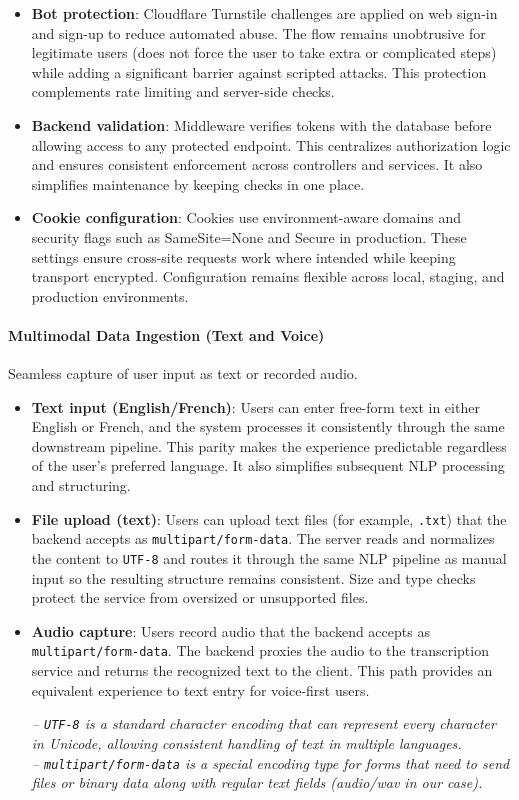 \documentclass[12pt,a4paper]{article}
\begin{document}
\begin{itemize}
  \item \textbf{Bot protection}: Cloudflare Turnstile challenges are applied on web sign-in and sign-up to reduce automated abuse. The flow remains unobtrusive for legitimate users (does not force the user to take extra or complicated steps) while adding a significant barrier against scripted attacks. This protection complements rate limiting and server-side checks.
  \item \textbf{Backend validation}: Middleware verifies tokens with the database before allowing access to any protected endpoint. This centralizes authorization logic and ensures consistent enforcement across controllers and services. It also simplifies maintenance by keeping checks in one place.
  \item \textbf{Cookie configuration}: Cookies use environment-aware domains and security flags such as SameSite=None and Secure in production. These settings ensure cross-site requests work where intended while keeping transport encrypted. Configuration remains flexible across local, staging, and production environments.
\end{itemize}

\paragraph{Multimodal Data Ingestion (Text and Voice)}\mbox{}

Seamless capture of user input as text or recorded audio.
\begin{itemize}
  \item \textbf{Text input (English/French)}: Users can enter free-form text in either English or French, and the system processes it consistently through the same downstream pipeline. This parity makes the experience predictable regardless of the user's preferred language. It also simplifies subsequent NLP processing and structuring.
  \item \textbf{File upload (text)}: Users can upload text files (for example, \texttt{.txt}) that the backend accepts as \texttt{multipart/form-data}. The server reads and normalizes the content to \texttt{UTF-8} and routes it through the same NLP pipeline as manual input so the resulting structure remains consistent. Size and type checks protect the service from oversized or unsupported files.
  \item \textbf{Audio capture}: Users record audio that the backend accepts as \texttt{multipart/form-data}. The backend proxies the audio to the transcription service and returns the recognized text to the client. This path provides an equivalent experience to text entry for voice-first users.
  \begin{center}
    \small\textit{-- \texttt{UTF-8} is a standard character encoding that can represent every character in Unicode, allowing consistent handling of text in multiple languages.}\\
    \small\textit{-- \texttt{multipart/form-data} is a special encoding type for forms that need to send files or binary data along with regular text fields (audio/wav in our case).}
    \end{center}
\end{itemize}
\end{document}
